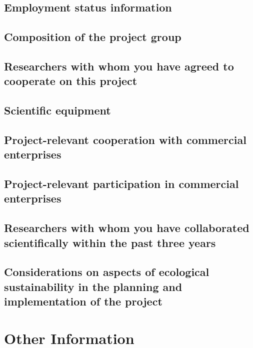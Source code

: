 \documentclass[english, 53.02]{proposal}
\begin{document}
\subsection{Employment status information}

\subsection{Composition of the project group}

\subsection{Researchers with whom you have agreed to cooperate on this project}

\subsection{Scientific equipment}

\subsection{Project-relevant cooperation with commercial enterprises}

\subsection{Project-relevant participation in commercial enterprises}

\subsection{Researchers with whom you have collaborated scientifically within the past three years}

\subsection{Considerations on aspects of ecological sustainability in the planning and implementation of the project}


\section{Other Information}
\end{document}
